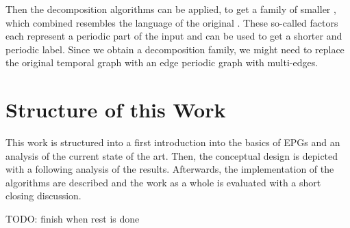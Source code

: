 Then the \DFA decomposition algorithms can be applied, to get a family of smaller \DFAs, which combined resembles the language of the original \DFA.
These so-called factors each represent a periodic part of the input and can be used to get a shorter and periodic label.
Since we obtain a decomposition family, we might need to replace the original temporal graph with an edge periodic graph with multi-edges. 

\section{Structure of this Work}
\label{ch:Intoduction:sec:Structure}
This work is structured into a first introduction into the basics of EPGs and an analysis of the current state of the art.
Then, the conceptual design is depicted with a following analysis of the results.
Afterwards, the implementation of the algorithms are described and the work as a whole is evaluated with a short closing discussion.  

TODO: finish when rest is done

